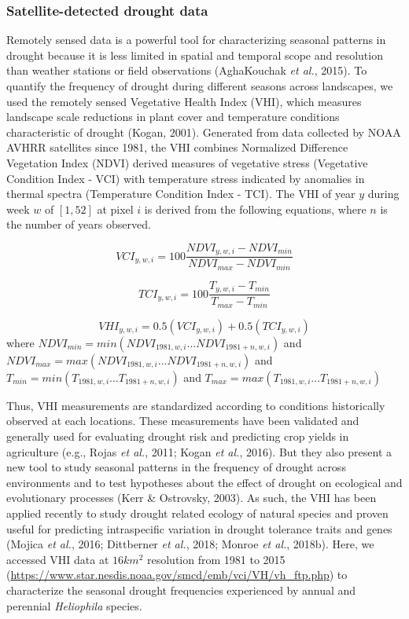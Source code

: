 \documentclass[man,floatsintext]{apa6}
\theoremstyle{definition}
\theoremstyle{definition}
\theoremstyle{definition}
\theoremstyle{remark}
\begin{document}
\hypertarget{satellite-detected-drought-data}{%
\subsubsection{Satellite-detected drought
data}\label{satellite-detected-drought-data}}

Remotely sensed data is a powerful tool for characterizing seasonal
patterns in drought because it is less limited in spatial and temporal
scope and resolution than weather stations or field observations
(AghaKouchak \emph{et al.}, 2015). To quantify the frequency of drought
during different seasons across landscapes, we used the remotely sensed
Vegetative Health Index (VHI), which measures landscape scale reductions
in plant cover and temperature conditions characteristic of drought
(Kogan, 2001). Generated from data collected by NOAA AVHRR satellites
since 1981, the VHI combines Normalized Difference Vegetation Index
(NDVI) derived measures of vegetative stress (Vegetative Condition Index
- VCI) with temperature stress indicated by anomalies in thermal spectra
(Temperature Condition Index - TCI). The VHI of year \(y\) during week
\(w\) of \([1,52]\) at pixel \(i\) is derived from the following
equations, where \(n\) is the number of years observed.

\[VCI_{y,w,i} = 100\frac{NDVI_{y,w,i} - NDVI_{min}}{NDVI_{max} - NDVI_{min}}\]

\[TCI_{y,w,i} = 100\frac{T_{y,w,i} - T_{min}}{T_{max} - T_{min}}\]

\[VHI_{y,w,i} = 0.5(VCI_{y,w,i}) + 0.5(TCI_{y,w,i})\] where
\(NDVI_{min} = min(NDVI_{1981,w,i}...NDVI_{1981+n,w,i})\) and
\(NDVI_{max} = max(NDVI_{1981,w,i}...NDVI_{1981+n,w,i})\) and
\(T_{min} = min(T_{1981,w,i}...T_{1981+n,w,i})\) and
\(T_{max} = max(T_{1981,w,i}...T_{1981+n,w,i})\)

Thus, VHI measurements are standardized according to conditions
historically observed at each locations. These measurements have been
validated and generally used for evaluating drought risk and predicting
crop yields in agriculture (e.g., Rojas \emph{et al.}, 2011; Kogan
\emph{et al.}, 2016). But they also present a new tool to study seasonal
patterns in the frequency of drought across environments and to test
hypotheses about the effect of drought on ecological and evolutionary
processes (Kerr \& Ostrovsky, 2003). As such, the VHI has been applied
recently to study drought related ecology of natural species and proven
useful for predicting intraspecific variation in drought tolerance
traits and genes (Mojica \emph{et al.}, 2016; Dittberner \emph{et al.},
2018; Monroe \emph{et al.}, 2018b). Here, we accessed VHI data at
\(16km^2\) resolution from 1981 to 2015
(\url{https://www.star.nesdis.noaa.gov/smcd/emb/vci/VH/vh_ftp.php}) to
characterize the seasonal drought frequencies experienced by annual and
perennial \emph{Heliophila} species.
\end{document}
